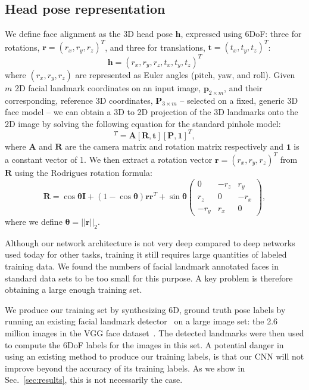 \documentclass[10pt,twocolumn,letterpaper]{article}
\newcommand{\minisection}[1]{\vspace{1mm}\noindent{\bf #1}}
\begin{document}
\subsection{Head pose representation}\label{sec:training}
We define face alignment as the 3D head pose $\mathbf{h}$, expressed using 6DoF: three for rotations, $\mathbf{r}=(r_x,r_y,r_z)^T$, and three for translations, $\mathbf{t}=(t_x,t_y,t_z)^T$:
\begin{equation}
\mathbf{h} = (r_x, r_y, r_z, t_x, t_y, t_z)^T
\end{equation}
where $(r_x, r_y, r_z)$ are represented as Euler angles (pitch, yaw, and roll). Given $m$ 2D facial landmark coordinates on an input image, $\mathbf{p}_{2\times m}$, and their corresponding, reference 3D coordinates, $\mathbf{P}_{3\times m}$ -- selected on a fixed, generic 3D face model -- we can obtain a 3D to 2D projection of the 3D landmarks onto the 2D image by solving the following equation for the standard pinhole model:
\begin{equation}
[\mathbf{p},\mathbf{1}]^T = \mathbf{A}[\mathbf{R},\mathbf{t}][\mathbf{P},\mathbf{1}]^T,
\label{eqn:pinhole_model}
\end{equation}
where $\mathbf{A}$ and $\mathbf{R}$ are the camera matrix and rotation matrix respectively and $\mathbf{1}$ is a constant vector of 1. We then extract a rotation vector $\mathbf{r}=(r_x,r_y,r_z)^T$ from $\mathbf{R}$ using the Rodrigues rotation formula:
$$
\mathbf{R} = \cos\mathbf{\theta}\mathbf{I} + (1-\cos\mathbf{\theta})\mathbf{r}\mathbf{r}^T + \sin\mathbf{\theta}
\begin{pmatrix} 
0 & -r_z & r_y \\ 
r_z & 0 & -r_x \\ 
-r_y & r_x & 0  
\end{pmatrix},
$$
where we define $\mathbf{\theta} = ||\mathbf{r}||_2$.

\minisection{Obtaining enough training examples.}
Although our network architecture is not very deep compared to deep networks used today  for other tasks, training it still requires large quantities of labeled training data. We found the numbers of facial landmark annotated faces in standard data sets to be too small for this purpose. A key problem is therefore obtaining a large enough training set.


We produce our training set by synthesizing 6D, ground truth pose labels by running an existing facial landmark detector~\cite{baltruvsaitis2016openface} on a large image set: the 2.6 million images in the VGG face dataset~\cite{Parkhi15}. The detected landmarks were then used to compute the 6DoF labels for the images in this set. A potential danger in using an existing method to produce our training labels, is that our CNN will not improve beyond the accuracy of its training labels. As we show in Sec.~\ref{sec:results}, this is not necessarily the case.
\end{document}
